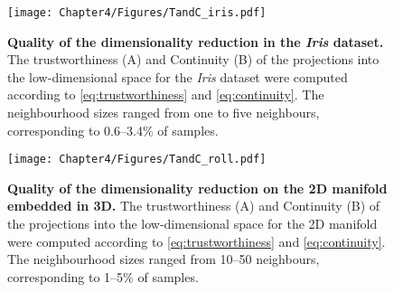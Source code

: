 \begin{figure}[hbtp]
	\centering
	\texttt{[image: Chapter4/Figures/TandC\_iris.pdf]}
	\caption[\textbf{Quality of the dimensionality reduction in the \textit{Iris} dataset.}]{\textbf{Quality of the dimensionality reduction in the \textit{Iris} dataset.} The trustworthiness (A)  and Continuity (B) of the projections into the low-dimensional space for the \textit{Iris} dataset were computed according to \cref{eq:trustworthiness} and \cref{eq:continuity}. The neighbourhood sizes ranged from one to five neighbours, corresponding to \numrange{0.6}{3.4}\% of samples.}
	 	\label{fig:TandC-iris}
\end{figure}


\begin{figure}[hbtp]
	\centering
	\texttt{[image: Chapter4/Figures/TandC\_roll.pdf]}
	\caption[\textbf{Quality of the dimensionality reduction on the 2D manifold embedded in 3D.}]{\textbf{Quality of the dimensionality reduction on the 2D manifold embedded in 3D.} The trustworthiness (A)  and Continuity (B) of the projections into the low-dimensional space for the 2D manifold were computed according to \cref{eq:trustworthiness} and \cref{eq:continuity}. The neighbourhood sizes ranged from \numrange{10}{50} neighbours, corresponding to \numrange{1}{5}\% of samples.} 
	 	\label{fig:TandC-roll}
\end{figure}

